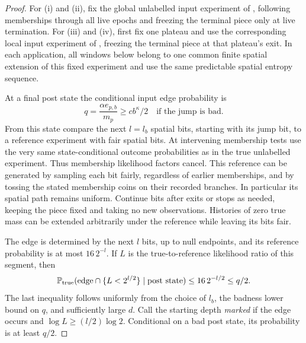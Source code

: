 \begin{proof}
For (i) and (ii), fix the global unlabelled input experiment of
, following memberships through all live epochs
and freezing the terminal piece only at live termination. For (iii) and
(iv), first fix one plateau and use the corresponding local input experiment
of , freezing the terminal piece at that
plateau's exit. In each application, all windows below belong to one common
finite spatial extension of this fixed experiment and use the same
predictable spatial entropy sequence.

At a final post state the conditional input edge probability is
\[
 q=\frac{\alpha e_{p,b}}{m_p}\ge c b^\kappa/2
 \quad\text{if the jump is bad}.
\]
From this state compare the next $l=l_b$ spatial bits, starting with its
jump bit, to a reference experiment with fair spatial bits. At intervening
membership tests use the very same state-conditional outcome probabilities
as in the true unlabelled experiment. Thus membership likelihood factors
cancel. This reference can be generated by sampling each bit fairly,
regardless of earlier memberships, and by tossing the stated membership
coins on their recorded branches. In particular its spatial path remains
uniform. Continue bits after exits or stops as needed, keeping the piece
fixed and taking no new observations. Histories of zero true mass can be
extended arbitrarily under the reference while leaving its bits fair.

The edge is determined by the next $l$ bits, up to null endpoints, and its
reference probability is at most $16\,2^{-l}$. If $L$ is the
true-to-reference likelihood ratio of this segment, then
\[
 \mathbb P_{\rm true}(\mathrm{edge}\cap\{L<2^{l/2}\}\mid\text{post state})
 \le16\,2^{-l/2}\le q/2.
\]
The last inequality follows uniformly from the choice of $l_b$, the badness
lower bound on $q$, and sufficiently large $d$. Call the starting depth
\emph{marked} if the edge occurs and $\log L\ge(l/2)\log2$.
Conditional on a bad post state, its probability is at least $q/2$.


\end{proof}
